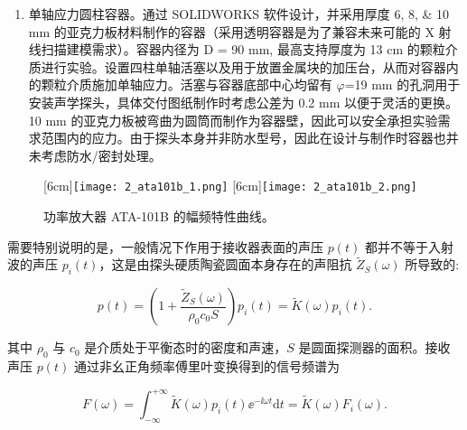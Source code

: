 \begin{enumerate}
  \item 单轴应力圆柱容器。通过 SOLIDWORKS 软件设计，并采用厚度 \numlist{6;8;10} \unit{\milli\meter} 的亚克力板材料制作的容器（采用透明容器是为了兼容未来可能的 X 射线扫描建模需求）。容器内径为 D = 90 \unit{\milli\meter}, 最高支持厚度为 13 \unit{\centi\meter} 的颗粒介质进行实验。设置四柱单轴活塞以及用于放置金属块的加压台，从而对容器内的颗粒介质施加单轴应力。活塞与容器底部中心均留有 $\varphi$=19 \unit{\milli\meter} 的孔洞用于安装声学探头，具体交付图纸制作时考虑公差为 0.2 \unit{\milli\meter} 以便于灵活的更换。10 \unit{\milli\meter} 的亚克力板被弯曲为圆筒而制作为容器壁，因此可以安全承担实验需求范围内的应力。由于探头本身并非防水型号，因此在设计与制作时容器也并未考虑防水/密封处理。
\end{enumerate}

\begin{figure}[!hbtp]
  \centering
                  [6cm]{\texttt{[image: 2\_ata101b\_1.png]}}
  \hspace{1cm}
                  [6cm]{\texttt{[image: 2\_ata101b\_2.png]}}
  \caption{功率放大器 ATA-101B 的幅频特性曲线。}
  \label{fig:amp_freq_curve}
\end{figure}


需要特别说明的是，一般情况下作用于接收器表面的声压 $p(t)$ 都并不等于入射波的声压 $p_{i}(t)$，这是由探头硬质陶瓷圆面本身存在的声阻抗 $\widetilde{Z}_{S}(\omega)$ 所导致的:

\begin{equation}
  p(t) = \left(1 + \frac{\widetilde{Z}_{S}(\omega)}{\rho_{0}c_{0}S}\right)p_{i}(t) =\widetilde{K}(\omega)p_{i}(t).
\end{equation}

其中 $\rho_{0}$ 与 $c_{0}$ 是介质处于平衡态时的密度和声速，$S$ 是圆面探测器的面积。接收声压 $p(t)$ 通过非幺正角频率傅里叶变换得到的信号频谱为

\begin{equation}
  F(\omega) = \int_{-\infty}^{+\infty}\widetilde{K}(\omega)p_{i}(t){\ee}^{-\ii\omega t}\mathrm{d}t = \widetilde{K}(\omega)F_{i}(\omega).
\end{equation}

